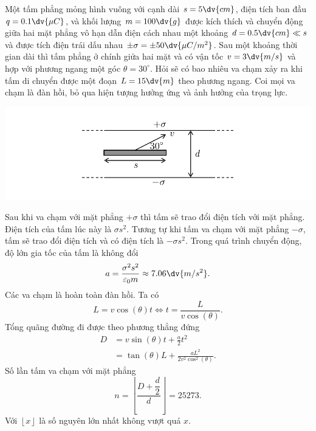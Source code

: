     \begin{vd}
    Một tấm phẳng mỏng hình vuông với cạnh dài $s=5\dv{cm}$, điện tích ban đầu $q=0.1\dv{\mu C}$, và khối lượng $m=100\dv{g}$ được kích thích và chuyển động giữa hai mặt phẳng vô hạn dẫn điện cách nhau một khoảng $d=0.5\dv{cm}\ll s$ và được tích điện trái dấu nhau $\pm \sigma=\pm50\dv{\mu C/m^2}$. Sau một khoảng thời gian dài thì tấm phẳng ở chính giửa hai mặt và có vận tốc $v=3\dv{m/s}$ và hợp với phương ngang một góc $\theta=30^\circ$. Hỏi sẽ có bao nhiêu va chạm xảy ra khi tấm di chuyển được một đoạn $L=15\dv{m}$ theo phương ngang. Coi mọi va chạm là đàn hồi, bỏ qua hiện tượng hưởng ứng và ảnh hưởng của trọng lực.
    \begin{center}
         \includegraphics[width=\textwidth]{Anh/13.pdf}
    \end{center}
\end{vd}
\begin{loigiai}
Sau khi va chạm với mặt phẳng $+\sigma$ thì tấm sẽ trao đổi điện tích với mặt phẳng. Điện tích của tấm lúc này là $\sigma s^2$. Tương tự khi tấm va chạm với mặt phẳng $-\sigma$, tấm sẽ trao đổi điện tích và có điện tích là $-\sigma s^2$. Trong quá trình chuyển động, độ lớn gia tốc của tấm là không đổi $$a=\frac{\sigma^2s^2}{\varepsilon_0m}\approx7.06\dv{m/s^2}.$$
Các va chạm là hoàn toàn đàn hồi.
Ta có $$L=v\cos(\theta)t\Leftrightarrow t=\frac{L}{v\cos(\theta)}.$$
Tổng quãng đường đi được theo phương thẳng đứng
\begin{equation*}
    \begin{aligned}
     D&=v\sin(\theta)t+\frac{a}{2}t^2\\
     &=\tan(\theta)L+\frac{aL^2}{2v^2\cos^2(\theta)}.
    \end{aligned}
\end{equation*}
Số lần tấm va chạm với mặt phẳng
$$n=\left \lfloor{\frac{D+\dfrac{d}{2}}{d}}\right \rfloor=25273.$$
Với $\left \lfloor{x}\right \rfloor$ là số nguyên lớn nhất không vượt quá $x$.
\end{loigiai}

